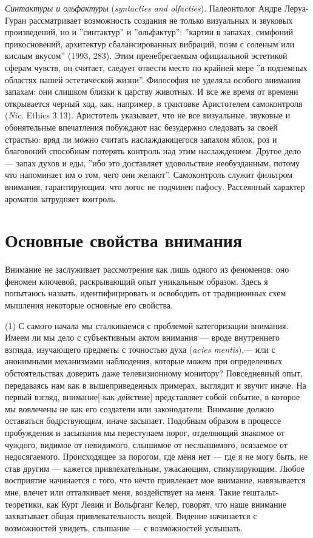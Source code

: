 \documentclass[12pt]{book}
\begin{document}
\textit{Синтактуры и ольфактуры} (\textit{syntacties and olfacties}). Палеонтолог Андре Леруа-Гуран рассматривает возможность создания не только визуальных и звуковых произведений, но и ''синтактур'' и ''ольфактур'': ''картин в запахах, симфоний прикосновений, архитектур сбалансированных вибраций, поэм с соленым или кислым вкусом'' (1993, 283). Этим пренебрегаемым официальной эстетикой сферам чувств, он считает, следует отвести место по крайней мере ''в подземных областях нашей эстетической жизни''. Философия не уделяла особого внимания запахам: они слишком близки к царству животных. И все же время от времени открывается черный ход, как, например, в трактовке Аристотелем самоконтроля (\textit{Nic.} Ethics 3.13). Аристотель указывает, что не все визуальные, звуковые и обонятельные впечатления побуждают нас безудержно следовать за своей страстью: вряд ли можно считать наслаждающегося запахом яблок, роз и благовоний способным потерять контроль над этим наслаждением. Другое дело --- запах духов и еды, ''ибо это доставляет удовольствие необузданным, потому что напоминает им о том, чего они желают''. Самоконтроль служит фильтром внимания, гарантирующим, что логос не подчинен пафосу. Рассеянный характер ароматов затрудняет контроль.

\section{Основные свойства внимания}

Внимание не заслуживает рассмотрения как лишь одного из феноменов: оно феномен ключевой, раскрывающий опыт уникальным образом. Здесь я попытаюсь назвать, идентифицировать и освободить от традиционных схем мышления некоторые основные его свойства.

(1) С самого начала мы сталкиваемся с проблемой категоризации внимания. Имеем ли мы дело с субъективным актом внимания --- вроде внутреннего взгляда, изучающего предметы с точностью духа (\textit{acies mentis}),--- или с анонимными механизмами наблюдения, которые можем при определенных обстоятельствах доверить даже телевизионному монитору? Повседневный опыт, передаваясь нам как в вышеприведенных примерах, выглядит и звучит иначе. На первый взгляд, внимание[-как-действие] представляет собой событие, в которое мы вовлечены не как его создатели или законодатели. Внимание должно оставаться бодрствующим, иначе засыпает. Подобным образом в процессе пробуждения и засыпания мы переступаем порог, отделяющий знакомое от чуждого, видимое от невидимого, слышимое от неслышимого, осязаемое от недосягаемого. Происходящее за порогом, где меня нет --- где я не могу быть, не став другим --- кажется привлекательным, ужасающим, стимулирующим. Любое восприятие начинается с того, что нечто привлекает мое внимание, навязывается мне, влечет или отталкивает меня, воздействует на меня. Такие гештальт-теоретики, как Курт Левин и Вольфганг Келер, говорят, что наше внимание захватывает общая привлекательность вещей. Видение начинается с возможностей увидеть, слышание --- с возможностей услышать.
\end{document}
